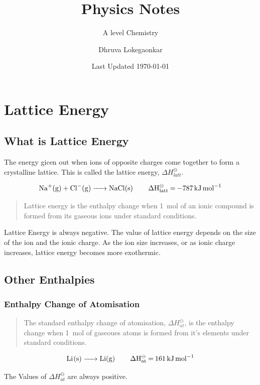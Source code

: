 \documentclass{scrbook}
\title{Physics Notes}
\subtitle{A level Chemistry}
\date{Last Updated \today{}}
\author{Dhruva Lokegaonkar}
\begin{document}
\maketitle
\tableofcontents

\chapter{Lattice Energy}

\section{What is Lattice Energy}

	The energy gicen out when ions of opposite charges come together to form a crystalline lattice. This is called the lattice energy, $\Delta H_{latt}^\ominus$.

	\[ \ce{Na+(g) + Cl-(g) ->  NaCl(s) \qquad \Delta H^\ominus_{latt} = \SI{-787}{ \kilo\joule\per\mole } }\]

	\begin{quote}
		Lattice energy is the enthalpy change when \SI{1}{\mole} of an ionic compound is formed from its gaseous ions under standard conditions.
	\end{quote}

	Lattice Energy is always negative. The value of lattice energy depends on the size of the ion and the ionic charge. As the ion size increases, or as ionic charge increases, lattice energy becomes more exothermic.

\section{Other Enthalpies}

\subsection{Enthalpy Change of Atomisation}

	\begin{quote}
		The standard enthalpy change of atomisation, $\Delta H_{at}^\ominus$, is the enthalpy change when \SI{1}{\mole} of gaseoues atoms is formed from it's elements under standard conditions.
	\end{quote}

	\[ \ce{ Li(s) -> Li(g) \qquad \Delta H^\ominus_{at} = \SI{161}{\kilo\joule\per\mole} } \]

	The Values of $\Delta H^\ominus_{at}$ are always positive.
\end{document}
